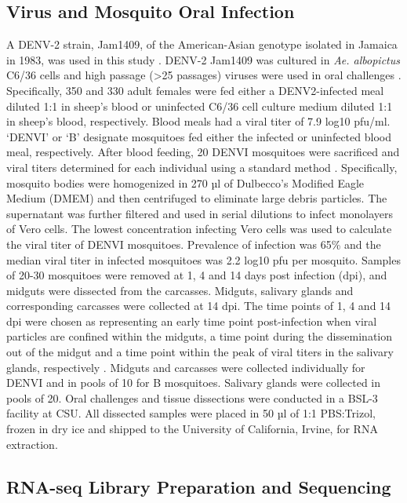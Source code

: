 \subsection{Virus and Mosquito Oral Infection}

A DENV-2 strain, Jam1409, of the American-Asian genotype isolated in Jamaica in 1983, was used in this study \cite{Deubel1986}. DENV-2 Jam1409 was cultured in \textit{Ae. albopictus} C6/36 cells and high passage (>25 passages) viruses were used in oral challenges \cite{Salazar2007}. Specifically, 350 and 330 adult females were fed either a DENV2-infected meal diluted 1:1 in sheep’s blood or uninfected C6/36 cell culture medium diluted 1:1 in sheep’s blood, respectively. Blood meals had a viral titer of 7.9 log10 pfu/ml. ‘DENVI’ or ‘B’ designate mosquitoes fed either the infected or uninfected blood meal, respectively. After blood feeding, 20 DENVI mosquitoes were sacrificed and viral titers determined for each individual using a standard method \cite{Hess2011}. Specifically, mosquito bodies were homogenized in 270 µl of Dulbecco’s Modified Eagle Medium (DMEM) and then centrifuged to eliminate large debris particles. The supernatant was further filtered and used in serial dilutions to infect monolayers of Vero cells. The lowest concentration infecting Vero cells was used to calculate the viral titer of DENVI mosquitoes. Prevalence of infection was 65\% and the median viral titer in infected mosquitoes was 2.2 log10 pfu per mosquito. Samples of 20-30 mosquitoes were removed at 1, 4 and 14 days post infection (dpi), and midguts were dissected from the carcasses. Midguts, salivary glands and corresponding carcasses were collected at 14 dpi. The time points of 1, 4 and 14 dpi were chosen as representing an early time point post-infection when viral particles are confined within the midguts, a time point during the dissemination out of the midgut and a time point within the peak of viral titers in the salivary glands, respectively \cite{Salazar2007}. Midguts and carcasses were collected individually for DENVI and in pools of 10 for B mosquitoes. Salivary glands were collected in pools of 20. Oral challenges and tissue dissections were conducted in a BSL-3 facility at CSU. All dissected samples were placed in 50 µl of 1:1 PBS:Trizol, frozen in dry ice and shipped to the University of California, Irvine, for RNA extraction.

\subsection{RNA-seq Library Preparation and Sequencing}

